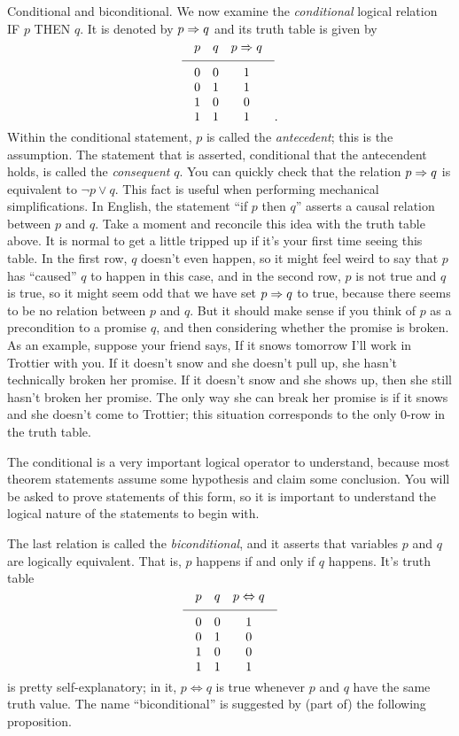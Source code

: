 \medskip\boldlabel{} Conditional and biconditional. We now examine the {\it conditional}
logical relation {\mc IF} $p$ {\mc THEN} $q$. It is denoted by $p\Rightarrow q$ and its truth table is given by
$$
\vbox{
\tabskip=1em plus.2em minus .2em
\halign{
\hfil$#$\hfil & \hfil$#$\hfil & \hfil$#$\hfil \cr
p & q & p\To q \cr
\noalign{\medskip}
\noalign{\hrule}
\noalign{\medskip}
0 & 0 & 1 \cr
0 & 1 & 1 \cr
1 & 0 & 0 \cr
1 & 1 & 1 \cr
}}.
$$
Within the conditional statement, $p$ is called the {\it antecedent}; this is the assumption. The
statement that is asserted, conditional that the antecendent holds, is called the {\it consequent} $q$.
You can quickly check that the relation $p\Rightarrow q$ is equivalent to $\neg p \vee q$. This fact is useful
when performing mechanical simplifications.
In English, the statement ``if $p$ then $q$'' asserts a causal relation between $p$ and $q$.
Take a moment and reconcile this idea with the truth table above.
It is normal to get a little tripped up if it's your first time seeing this table.
In the first row, $q$ doesn't even happen, so it might feel weird to say that $p$
has ``caused'' $q$ to happen in this case, and
in the second row, $p$ is not true
and $q$ is true, so it might seem odd that we have set $p\Rightarrow q$ to true, because there seems to be no relation
between $p$ and $q$.
But it should make sense if you think
of $p$ as a precondition to a promise $q$, and then considering whether the promise is broken. As an example,
suppose your friend says, If it snows tomorrow I'll work in Trottier with you. If it doesn't snow
and she doesn't pull up, she hasn't technically broken her promise. If it doesn't
snow and she shows up, then she still hasn't broken her promise. The only way she can break her promise is if
it snows and she doesn't come to Trottier; this situation corresponds to the only $0$-row in the truth table.

The conditional is a very important logical operator to understand, because most theorem statements assume
some hypothesis and claim some conclusion. You will be asked to prove statements of this form, so it is
important to understand the logical nature of the statements to begin with.

The last relation is called the {\it biconditional}, and it asserts that variables $p$ and $q$ are logically
equivalent. That is, $p$ happens if and only if $q$ happens. It's truth table
$$
\vbox{
\tabskip=1em plus.2em minus .2em
\halign{
\hfil$#$\hfil & \hfil$#$\hfil & \hfil$#$\hfil \cr
p & q & p\Leftrightarrow q \cr
\noalign{\medskip}
\noalign{\hrule}
\noalign{\medskip}
0 & 0 & 1 \cr
0 & 1 & 0 \cr
1 & 0 & 0 \cr
1 & 1 & 1 \cr
}}
$$
is pretty self-explanatory; in it, $p\Leftrightarrow q$ is true whenever $p$ and $q$ have the same truth value.
The name ``biconditional'' is suggested by (part of) the following proposition.

